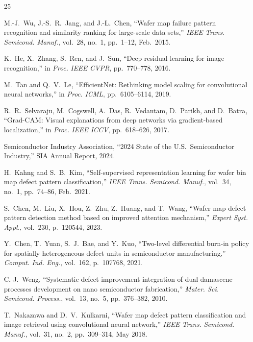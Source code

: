 \documentclass[conference]{IEEEtran}
\begin{document}
\begin{thebibliography}{25}

M.-J.~Wu, J.-S.~R.~Jang, and J.-L.~Chen,
``Wafer map failure pattern recognition and similarity ranking for
large-scale data sets,''
\textit{IEEE Trans. Semicond. Manuf.},
vol.~28, no.~1, pp.~1--12, Feb.\ 2015.

K.~He, X.~Zhang, S.~Ren, and J.~Sun,
``Deep residual learning for image recognition,''
in \textit{Proc. IEEE CVPR}, pp.~770--778, 2016.

M.~Tan and Q.~V.~Le,
``EfficientNet: Rethinking model scaling for convolutional neural
networks,''
in \textit{Proc. ICML}, pp.~6105--6114, 2019.

R.~R.~Selvaraju, M.~Cogswell, A.~Das, R.~Vedantam, D.~Parikh, and
D.~Batra,
``Grad-CAM: Visual explanations from deep networks via gradient-based
localization,''
in \textit{Proc. IEEE ICCV}, pp.~618--626, 2017.

Semiconductor Industry Association,
``2024 State of the U.S.\ Semiconductor Industry,''
SIA Annual Report, 2024.

H.~Kahng and S.~B.~Kim,
``Self-supervised representation learning for wafer bin map defect pattern
classification,''
\textit{IEEE Trans. Semicond. Manuf.},
vol.~34, no.~1, pp.~74--86, Feb.\ 2021.

S.~Chen, M.~Liu, X.~Hou, Z.~Zhu, Z.~Huang, and T.~Wang,
``Wafer map defect pattern detection method based on improved attention
mechanism,''
\textit{Expert Syst. Appl.}, vol.~230, p.~120544, 2023.

Y.~Chen, T.~Yuan, S.~J.~Bae, and Y.~Kuo,
``Two-level differential burn-in policy for spatially heterogeneous defect
units in semiconductor manufacturing,''
\textit{Comput. Ind. Eng.}, vol.~162, p.~107768, 2021.

C.-J.~Weng,
``Systematic defect improvement integration of dual damascene processes
development on nano semiconductor fabrication,''
\textit{Mater. Sci. Semicond. Process.},
vol.~13, no.~5, pp.~376--382, 2010.

T.~Nakazawa and D.~V.~Kulkarni,
``Wafer map defect pattern classification and image retrieval using
convolutional neural network,''
\textit{IEEE Trans. Semicond. Manuf.},
vol.~31, no.~2, pp.~309--314, May 2018.


\end{thebibliography}
\end{document}
